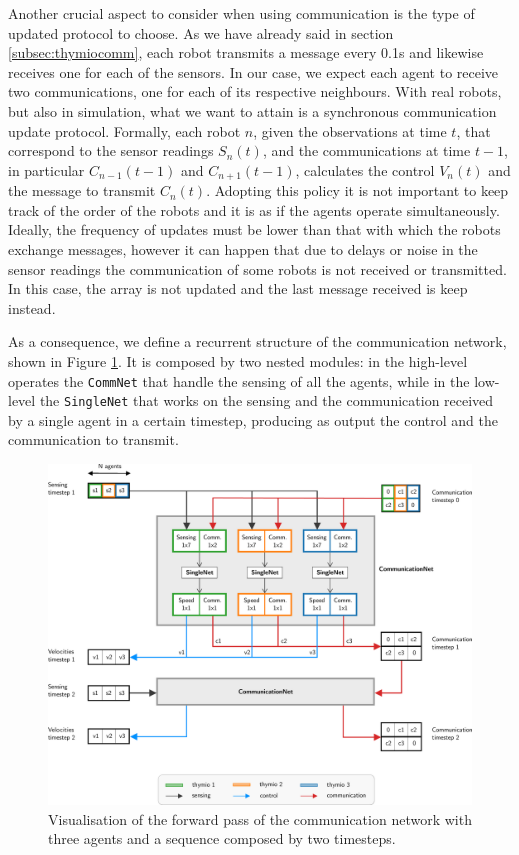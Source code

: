 Another crucial aspect to consider when using communication is the type of   
updated protocol to choose. As we have already said in section 
\ref{subsec:thymiocomm}, each robot transmits a message every 0.1\gls{s} 
and likewise receives one for each of the sensors. In our case, we expect 
each agent to receive two communications, one for each of its respective 
neighbours. 
With real robots, but also in simulation, what we want to attain is a 
synchronous communication update protocol. Formally, each robot $n$, 
given the observations at time $t$, that correspond to the sensor readings 
$S_n(t)$, and the communications at time $t-1$, in particular $C_{n-1}(t-1)$ 
and $C_{n+1}(t-1)$, calculates the control $V_n(t)$ and the message to 
transmit $C_n(t)$. 
Adopting this policy it is not important to keep track of the order of the 
robots and it is as if the agents operate simultaneously. 
Ideally, the frequency of updates must be lower than that with which the 
robots exchange messages, however it can happen that due to delays or 
noise in the sensor readings the communication of some robots is not 
received or transmitted. In this case, the array is not updated and the last 
message received is keep instead. 

As a consequence, we define a recurrent structure of the communication 
network, shown in Figure \ref{fig:commnet1}. It is composed by two nested 
modules: in the high-level operates the \texttt{CommNet} that handle the 
sensing of all the agents, while in the low-level the \texttt{SingleNet} that 
works on the sensing and the communication received by a single agent in a 
certain timestep, producing as output the control and the communication to 
transmit. 
\begin{figure}[!htb]
	\centering
	\includegraphics[width=\textwidth]{contents/images/commnet2}
	\caption[Communication network.]{Visualisation of the forward pass of the 
		communication network with three agents and a sequence composed by two 
		timesteps.}
	\label{fig:commnet1}
\end{figure}

